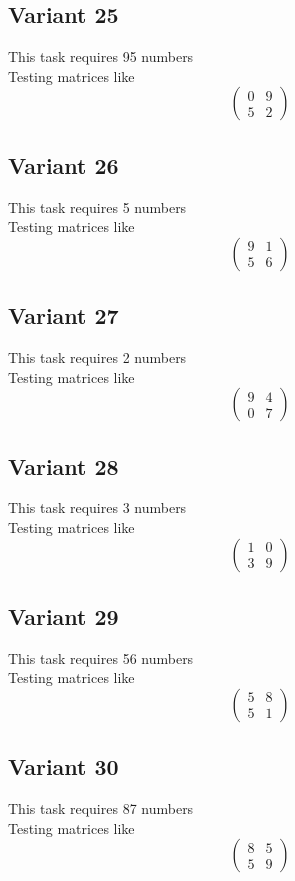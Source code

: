 \documentclass[11pt]{article}
\begin{document}
\subsection*{Variant 25}
This task requires 95 numbers\\
Testing matrices like \[ \begin{pmatrix} 0 & 9\\ 5 & 2 \end{pmatrix} \]

\subsection*{Variant 26}
This task requires 5 numbers\\
Testing matrices like \[ \begin{pmatrix} 9 & 1\\ 5 & 6 \end{pmatrix} \]

\subsection*{Variant 27}
This task requires 2 numbers\\
Testing matrices like \[ \begin{pmatrix} 9 & 4\\ 0 & 7 \end{pmatrix} \]

\subsection*{Variant 28}
This task requires 3 numbers\\
Testing matrices like \[ \begin{pmatrix} 1 & 0\\ 3 & 9 \end{pmatrix} \]

\subsection*{Variant 29}
This task requires 56 numbers\\
Testing matrices like \[ \begin{pmatrix} 5 & 8\\ 5 & 1 \end{pmatrix} \]

\subsection*{Variant 30}
This task requires 87 numbers\\
Testing matrices like \[ \begin{pmatrix} 8 & 5\\ 5 & 9 \end{pmatrix} \]
\end{document}
